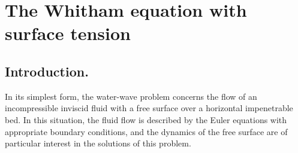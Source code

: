 \section{The Whitham equation with surface tension}

\subsection{Introduction.}
In its simplest form, the water-wave problem concerns
the flow of an incompressible inviscid
fluid with a free surface over a horizontal impenetrable bed.
In this situation, the fluid flow 
is described by the Euler equations with appropriate boundary conditions,
and the dynamics of the free surface are of particular interest
in the solutions of this problem.

